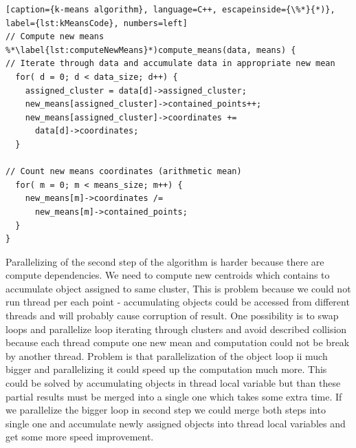 \begin{Code}
    \centering
\begin{lstlisting}[caption={k-means algorithm}, language=C++, escapeinside={\%*}{*)}, label={lst:kMeansCode}, numbers=left]
// Compute new means
%*\label{lst:computeNewMeans}*)compute_means(data, means) {
// Iterate through data and accumulate data in appropriate new mean
  for( d = 0; d < data_size; d++) {
    assigned_cluster = data[d]->assigned_cluster;
    new_means[assigned_cluster]->contained_points++;
    new_means[assigned_cluster]->coordinates +=
      data[d]->coordinates;
  }
  
// Count new means coordinates (arithmetic mean)
  for( m = 0; m < means_size; m++) {
    new_means[m]->coordinates /=
      new_means[m]->contained_points;
  }
}
\end{lstlisting}
    \caption{Code for second step - computing new means}
\end{Code}
Parallelizing of the second step of the algorithm is harder because there are compute dependencies. We need to compute new centroids which contains to accumulate object assigned to same cluster, This is problem because we could not run thread per each point - accumulating objects could be accessed from different threads and will probably cause corruption of result.
One possibility is to swap loops and parallelize loop iterating through clusters and avoid described collision because each thread compute one new mean and computation could not be break by another thread. Problem is that parallelization of the object loop ii much bigger and parallelizing it could speed up the computation much more. This could be solved by accumulating objects in thread local variable but than these partial results must be merged into a single one which takes some extra time.
If we parallelize the bigger loop in second step we could merge both steps into single one and accumulate newly assigned objects into thread local variables and get some more speed improvement.